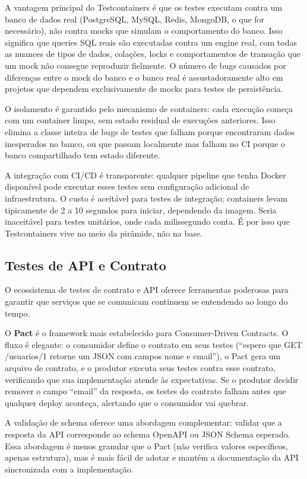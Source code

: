 A vantagem principal do Testcontainers é que os testes executam contra um
banco de dados real (PostgreSQL, MySQL, Redis, MongoDB, o que for necessário),
não contra mocks que simulam o comportamento do banco. Isso significa que
queries SQL reais são executadas contra um engine real, com todas as nuances de
tipos de dados, colações, locks e comportamentos de transação que um mock não
consegue reproduzir fielmente. O número de bugs causados por diferenças entre o
mock do banco e o banco real é assustadoramente alto em projetos que dependem
exclusivamente de mocks para testes de persistência.

O isolamento é garantido pelo mecanismo de containers: cada execução começa com
um container limpo, sem estado residual de execuções anteriores. Isso elimina a
classe inteira de bugs de testes que falham porque encontraram dados inesperados
no banco, ou que passam localmente mas falham no CI porque o banco compartilhado
tem estado diferente.

A integração com CI/CD é transparente: qualquer pipeline que tenha Docker
disponível pode executar esses testes sem configuração adicional de
infraestrutura. O custo é aceitável para testes de integração; containers
levam tipicamente de 2 a 10 segundos para iniciar, dependendo da imagem. Seria
inaceitável para testes unitários, onde cada milissegundo conta. É por isso
que Testcontainers vive no meio da pirâmide, não na base.

\subsection{Testes de API e Contrato}

O ecossistema de testes de contrato e API oferece ferramentas poderosas para
garantir que serviços que se comunicam continuem se entendendo ao longo do
tempo.

O \textbf{Pact} é o framework mais estabelecido para Consumer-Driven Contracts.
O fluxo é elegante: o consumidor define o contrato em seus testes
(``espero que GET /usuarios/1 retorne um JSON com campos nome e email''), o Pact
gera um arquivo de contrato, e o produtor executa seus testes contra esse
contrato, verificando que sua implementação atende às expectativas. Se o
produtor decidir remover o campo ``email'' da resposta, os testes do contrato
falham antes que qualquer deploy aconteça, alertando que o consumidor vai
quebrar.

A validação de schema oferece uma abordagem complementar: validar que a resposta
da API corresponde ao schema OpenAPI ou JSON Schema esperado. Essa abordagem é
menos granular que o Pact (não verifica valores específicos, apenas estrutura),
mas é mais fácil de adotar e mantém a documentação da API sincronizada com a
implementação.

